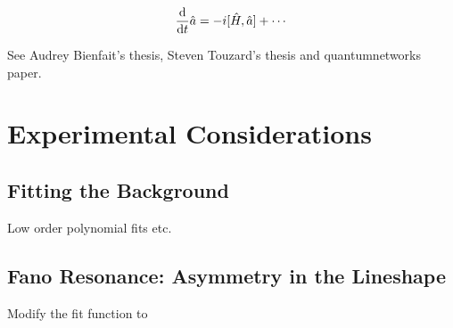 \begin{equation}
    \odv*{\hat{a}}{t} = -i[\hat{H}, \hat{a}] + \cdots
\end{equation}

See Audrey Bienfait's thesis, Steven Touzard's thesis and quantumnetworks paper. 

\section{Experimental Considerations}

\subsection{Fitting the Background}
Low order polynomial fits etc.

\subsection{Fano Resonance: Asymmetry in the Lineshape}
Modify the fit function to 